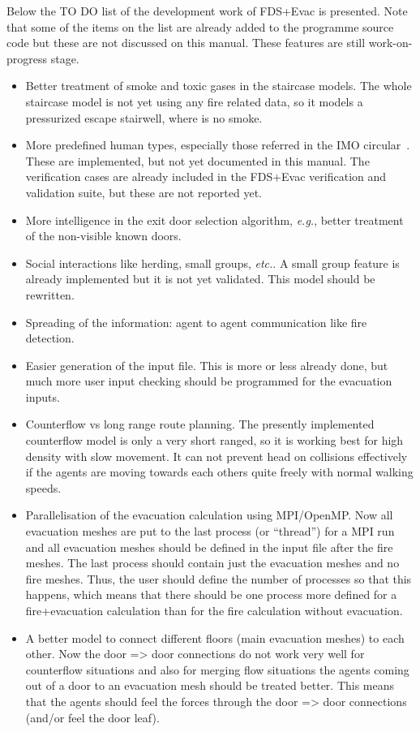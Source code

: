 \documentclass[12pt,a4paper,final,twoside]{stylevk}
\begin{document}
Below the TO DO list of the development work of FDS+Evac is presented.
Note that some of the items on the list are already added to the
programme source code but these are not discussed on this manual.
These features are still work-on-progress stage.
%
\begin{itemize}
%
\item Better treatment of smoke and toxic gases in the staircase
  models.  The whole staircase model is not yet using any fire related
  data, so it models a pressurized escape stairwell, where is no
  smoke.
%
\item More predefined human types, especially those referred in the
  IMO circular~\cite{IMO07}.  These are implemented, but not yet
  documented in this manual.  The verification cases are already
  included in the FDS+Evac verification and validation suite, but
  these are not reported yet.
%
\item More intelligence in the exit door selection algorithm,
  \emph{e.g.}, better treatment of the non-visible known doors.
%
\item Social interactions like herding, small groups, \emph{etc.}.  A
  small group feature is already implemented but it is not yet
  validated.  This model should be rewritten.
%
\item Spreading of the information: agent to agent communication like
  fire detection.
%
\item Easier generation of the input file.  This is more or less
  already done, but much more user input checking should be programmed
  for the evacuation inputs.
%
\item Counterflow vs long range route planning.  The presently
  implemented counterflow model is only a very short ranged, so it is
  working best for high density with slow movement.  It can not
  prevent head on collisions effectively if the agents are moving
  towards each others quite freely with normal walking speeds.
%
\item Parallelisation of the evacuation calculation using MPI/OpenMP.
  Now all evacuation meshes are put to the last process (or
  ``thread'') for a MPI run and all evacuation meshes should be
  defined in the input file after the fire meshes.  The last process
  should contain just the evacuation meshes and no fire meshes.  Thus,
  the user should define the number of processes so that this happens,
  which means that there should be one process more defined for a
  fire+evacuation calculation than for the fire calculation without
  evacuation.
%
\item A better model to connect different floors (main evacuation
  meshes) to each other.  Now the door => door connections do not work
  very well for counterflow situations and also for merging flow
  situations the agents coming out of a door to an evacuation mesh
  should be treated better. This means that the agents should feel the
  forces through the door => door connections (and/or feel the door
  leaf). 
%
\end{itemize}
%
\end{document}
